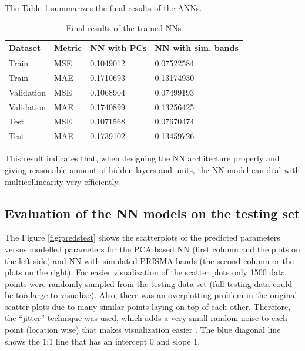 \documentclass[a4paper, twoside]{templates/ociamthesis}
\begin{document}
\newpage

The Table \ref{tab:losstable} summarizes the final results of the ANNs.

\begin{table}[H]

\caption{\label{tab:losstable}Final results of the trained NNs}
\centering
\begin{tabular}[t]{llll}
\toprule
Dataset & Metric & NN with PCs & NN with sim. bands\\
\midrule
Train & MSE & 0.1049012 & 0.07522584\\
Train & MAE & 0.1710693 & 0.13174930\\
Validation & MSE & 0.1068904 & 0.07499193\\
Validation & MAE & 0.1740899 & 0.13256425\\
Test & MSE & 0.1071568 & 0.07670474\\
\addlinespace
Test & MAE & 0.1739102 & 0.13459726\\
\bottomrule
\end{tabular}
\end{table}

This result indicates that, when designing the NN architecture properly and giving reasonable amount of hidden layers and units, the NN model can deal with multicollinearity very efficiently.

\hypertarget{evaluation-of-the-nn-models-on-the-testing-set}{%
\subsection{Evaluation of the NN models on the testing set}\label{evaluation-of-the-nn-models-on-the-testing-set}}

The Figure \ref{fig:predstest} shows the scatterplots of the predicted parameters versus modelled parameters for the PCA based NN (first column and the plots on the left side) and NN with simulated PRISMA bands (the second column or the plots on the right). For easier visualization of the scatter plots only 1500 data points were randomly sampled from the testing data set (full testing data could be too large to visualize). Also, there was an overplotting problem in the original scatter plots due to many similar points laying on top of each other. Therefore, the ``jitter'' technique was used, which adds a very small random noise to each point (location wise) that makes visualization easier \citep{wickham2016r, ggplot2}. The blue diagonal line shows the 1:1 line that has an intercept 0 and slope 1.
\end{document}
